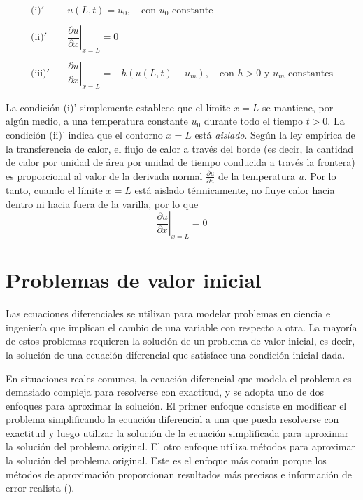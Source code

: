 \documentclass[
  spanish,
  us-letterpaper,
  DIV=11,
  numbers=noendperiod]{scrreprt}
\theoremstyle{definition}
\theoremstyle{plain}
\theoremstyle{remark}
\begin{document}
\[
\begin{aligned}
\text{(i)}'   &\quad u(L,t) = u_0, \quad \text{con } u_0 \text{ constante} \\ \\
\text{(ii)}'  &\quad \left. \dfrac{\partial u}{\partial x} \right|_{x=L} = 0 \\ \\
\text{(iii)}' &\quad \left. \dfrac{\partial u}{\partial x} \right|_{x=L} = -h(u(L,t)-u_m), \quad \text{con } h>0 \text{ y } u_m \text{ constantes}
\end{aligned}
\]

La condición (i)' simplemente establece que el límite \(x=L\) se
mantiene, por algún medio, a una temperatura constante \(u_0\) durante
todo el tiempo \(t>0\). La condición (ii)' indica que el contorno
\(x=L\) está \emph{aislado}. Según la ley empírica de la transferencia
de calor, el flujo de calor a través del borde (es decir, la cantidad de
calor por unidad de área por unidad de tiempo conducida a través la
frontera) es proporcional al valor de la derivada normal
\(\frac{\partial u}{\partial n}\) de la temperatura \(u\). Por lo tanto,
cuando el límite \(x=L\) está aislado térmicamente, no fluye calor hacia
dentro ni hacia fuera de la varilla, por lo que \[
\left. \dfrac{\partial u}{\partial x} \right|_{x=L} = 0
\]

\chapter{Problemas de valor inicial}\label{problemas-de-valor-inicial}

Las ecuaciones diferenciales se utilizan para modelar problemas en
ciencia e ingeniería que implican el cambio de una variable con respecto
a otra. La mayoría de estos problemas requieren la solución de un
problema de valor inicial, es decir, la solución de una ecuación
diferencial que satisface una condición inicial dada.

En situaciones reales comunes, la ecuación diferencial que modela el
problema es demasiado compleja para resolverse con exactitud, y se
adopta uno de dos enfoques para aproximar la solución. El primer enfoque
consiste en modificar el problema simplificando la ecuación diferencial
a una que pueda resolverse con exactitud y luego utilizar la solución de
la ecuación simplificada para aproximar la solución del problema
original. El otro enfoque utiliza métodos para aproximar la solución del
problema original. Este es el enfoque más común porque los métodos de
aproximación proporcionan resultados más precisos e información de error
realista ().
\end{document}
